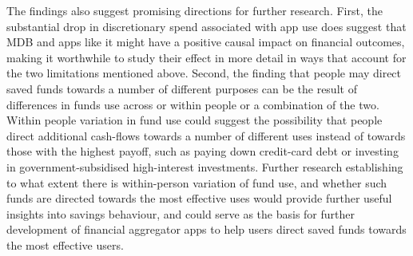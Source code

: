 The findings also suggest promising directions for further research. First, the
substantial drop in discretionary spend associated with app use does suggest
that MDB and apps like it might have a positive causal impact on financial
outcomes, making it worthwhile to study their effect in more detail in ways
that account for the two limitations mentioned above. Second, the finding that
people may direct saved funds towards a number of different purposes can be the
result of differences in funds use across or within people or a combination of
the two. Within people variation in fund use could suggest the possibility that people direct additional cash-flows
towards a number of different uses instead of towards those with the highest
payoff, such as paying down credit-card debt or investing in
government-subsidised high-interest investments. Further research establishing
to what extent there is within-person variation of fund use, and whether such
funds are directed towards the most effective uses would provide further useful
insights into savings behaviour, and could serve as the basis for further
development of financial aggregator apps to help users direct saved funds
towards the most effective users.








